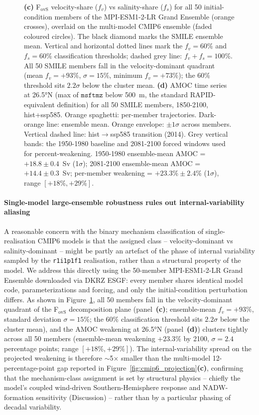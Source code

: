\documentclass[11pt,a4paper]{article}
\begin{document}
\begin{figure}
{\textbf{(c)} F$_{\mathrm{ovS}}$ velocity-share ($f_v$) vs salinity-share ($f_s$) for all 50 initial-condition members of the MPI-ESM1-2-LR Grand Ensemble (orange crosses), overlaid on the multi-model CMIP6 ensemble (faded coloured circles). The black diamond marks the SMILE ensemble mean. Vertical and horizontal dotted lines mark the $f_v=60\%$ and $f_s=60\%$ classification thresholds; dashed grey line: $f_v+f_s=100\%$. All 50 SMILE members fall in the velocity-dominant quadrant (mean $f_v=+93\%$, $\sigma=15\%$, minimum $f_v=+73\%$); the 60\% threshold sits $2.2\sigma$ below the cluster mean.
\textbf{(d)} AMOC time series at 26.5°N (max of $\mathtt{msftmz}$ below 500~m, the standard RAPID-equivalent definition) for all 50 SMILE members, 1850-2100, hist+ssp585. Orange spaghetti: per-member trajectories. Dark-orange line: ensemble mean. Orange envelope: $\pm 1\sigma$ across members. Vertical dashed line: hist$\rightarrow$ssp585 transition (2014). Grey vertical bands: the 1950-1980 baseline and 2081-2100 forced windows used for percent-weakening. 1950-1980 ensemble-mean AMOC = $+18.8\pm 0.4$~Sv (1$\sigma$); 2081-2100 ensemble-mean AMOC = $+14.4\pm 0.3$~Sv; per-member weakening = $+23.3\%\pm 2.4\%$ (1$\sigma$), range $[+18\%,+29\%]$.}
\label{fig:f6_diagnostics}
\end{figure}

\paragraph*{Single-model large-ensemble robustness rules out internal-variability aliasing}

A reasonable concern with the binary mechanism classification of single-realisation CMIP6 models is that the assigned class -- velocity-dominant vs salinity-dominant -- might be partly an artefact of the phase of internal variability sampled by the \texttt{r1i1p1f1} realisation, rather than a structural property of the model. We address this directly using the 50-member MPI-ESM1-2-LR Grand Ensemble downloaded via DKRZ ESGF: every member shares identical model code, parameterizations and forcing, and only the initial-condition perturbation differs. As shown in Figure~\ref{fig:f6_diagnostics}, all 50 members fall in the velocity-dominant quadrant of the F$_{\mathrm{ovS}}$ decomposition plane (panel~\textbf{(c)}; ensemble-mean $f_v=+93\%$, standard deviation $\sigma=15\%$; the $60\%$ classification threshold sits $2.2\sigma$ below the cluster mean), and the AMOC weakening at 26.5°N (panel~\textbf{(d)}) clusters tightly across all 50 members (ensemble-mean weakening $+23.3\%$ by 2100, $\sigma=2.4$ percentage points; range $[+18\%,+29\%]$). The internal-variability spread on the projected weakening is therefore $\sim$5$\times$ smaller than the multi-model 12-percentage-point gap reported in Figure~\ref{fig:cmip6_projection}\textbf{(c)}, confirming that the mechanism-class assignment is set by structural physics -- chiefly the model's coupled wind-driven Southern-Hemisphere response and NADW-formation sensitivity (Discussion) -- rather than by a particular phasing of decadal variability.
\end{document}
